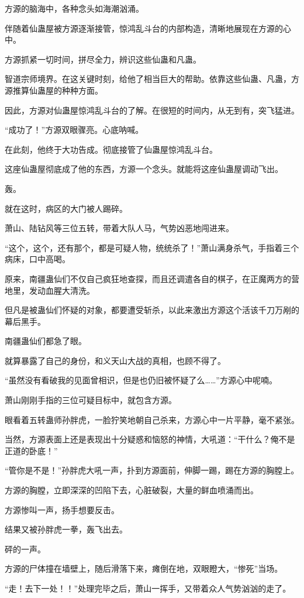 \begin{this_body}
方源的脑海中，各种念头如海潮汹涌。

伴随着仙蛊屋被方源逐渐接管，惊鸿乱斗台的内部构造，清晰地展现在方源的心中。

方源抓紧一切时间，拼尽全力，辨识这些仙蛊和凡蛊。

智道宗师境界。在这关键时刻，给他了相当巨大的帮助。依靠这些仙蛊、凡蛊，方源推算仙蛊屋的种种方面。

因此，方源对仙蛊屋惊鸿乱斗台的了解。在很短的时间内，从无到有，突飞猛进。

“成功了！”方源双眼骤亮。心底呐喊。

在此刻，他终于大功告成。彻底接管了仙蛊屋惊鸿乱斗台。

这座仙蛊屋彻底成了他的东西，方源一个念头。就能将这座仙蛊屋调动飞出。

轰。

就在这时，病区的大门被人踢碎。

萧山、陆钻风等三位五转，带着大队人马，气势凶恶地闯进来。

“这个，这个，还有那个，都是可疑人物，统统杀了！”萧山满身杀气，手指着三个病床，口中高喝。

原来，南疆蛊仙们不仅自己疯狂地查探，而且还调遣各自的棋子，在正魔两方的营地里，发动血腥大清洗。

但凡是被蛊仙们怀疑的对象，都要遭受斩杀，以此来激出方源这个活该千刀万剐的幕后黑手。

南疆蛊仙们都急了眼。

就算暴露了自己的身份，和义天山大战的真相，也顾不得了。

“虽然没有看破我的见面曾相识，但是也仍旧被怀疑了么……”方源心中呢喃。

萧山刚刚手指的三位可疑目标中，就包含方源。

眼看着五转蛊师孙胖虎，一脸狞笑地朝自己杀来，方源心中一片平静，毫不紧张。

当然，方源表面上还是表现出十分疑惑和恼怒的神情，大吼道：“干什么？俺不是正道的卧底！”

“管你是不是！”孙胖虎大吼一声，扑到方源面前，伸脚一踢，踢在方源的胸膛上。

方源的胸膛，立即深深的凹陷下去，心脏破裂，大量的鲜血喷涌而出。

方源惨叫一声，扬手想要反击。

结果又被孙胖虎一拳，轰飞出去。

砰的一声。

方源的尸体撞在墙壁上，随后滑落下来，瘫倒在地，双眼瞪大，“惨死”当场。

“走！去下一处！！”处理完毕之后，萧山一挥手，又带着众人气势汹汹的走了。


\end{this_body}
